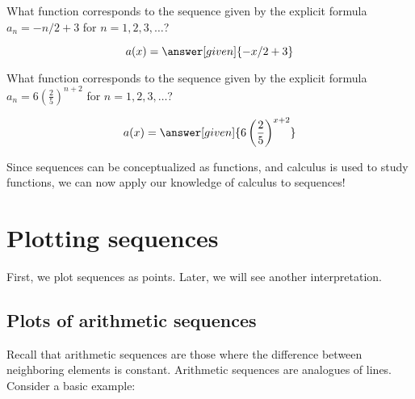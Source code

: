 \documentclass{ximera}
\begin{document}

\begin{question}
  What function corresponds to the sequence given by the explicit formula
  $a_n = -n/2+3$ for $n=1,2,3,\dots$?
  \begin{prompt}
    \[
    a(x) = \answer[given]{-x/2 + 3}
    \]
  \end{prompt}
\end{question}

\begin{question}
  What function corresponds to the sequence given by the explicit formula
  $a_n = 6\left(\frac{2}{5}\right)^{n+2}$ for $n=1,2,3,\dots$?
  \begin{prompt}
    \[
    a(x) = \answer[given]{6\left(\frac{2}{5}\right)^{x+2}}
    \]
  \end{prompt}
\end{question}

Since sequences can be conceptualized as functions, and calculus is
used to study functions, we can now apply our knowledge of calculus to
sequences!

\section{Plotting sequences}

First, we plot sequences as points. Later, we will see another
interpretation.

\subsection{Plots of arithmetic sequences}

Recall that arithmetic sequences are those where the difference
between neighboring elements is constant.  Arithmetic sequences are
analogues of lines.  Consider a basic example:
\begin{image}
\end{image}
\end{document}
